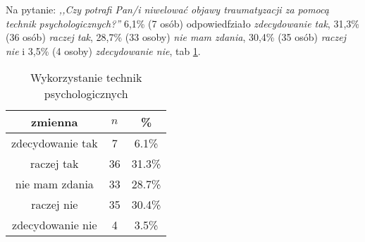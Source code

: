 
Na pytanie: \textit{,,Czy potrafi Pan/i niwelować objawy traumatyzacji za pomocą technik psychologicznych?''} 6,1\% (7 osób) odpowiedfziało \textit{zdecydowanie tak}, 31,3\% (36 osób) \textit{raczej tak}, 28,7\% (33 osoby) \textit{nie mam zdania}, 30,4\% (35 osób) \textit{raczej nie} i 3,5\% (4 osoby) \textit{zdecydowanie nie}, tab \ref{tab:Q12}.

\begin{table}[H]
\caption{Wykorzystanie technik psychologicznych}
\centering
\begin{tabular}{ | c | c | c |}
\hline
zmienna & $n$ & \% \\
\hline
zdecydowanie tak  &  7  & 6.1\% \\
\hline
raczej tak  &  36  & 31.3\% \\
\hline
nie mam zdania  &  33  & 28.7\% \\
\hline
raczej nie  &  35  & 30.4\% \\
\hline
zdecydowanie nie  &  4  & 3.5\% \\
\hline
\end{tabular}
\label{tab:Q12}
\end{table}
